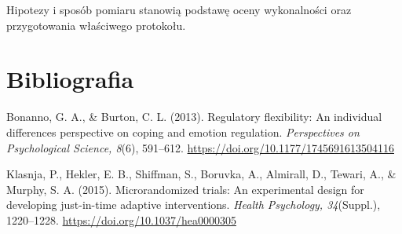 \documentclass[11pt,a4paper]{article}
\begin{document}
Hipotezy i sposób pomiaru stanowią podstawę oceny wykonalności oraz przygotowania właściwego protokołu.

\section*{Bibliografia}

{\setlength{\parindent}{0pt}
\setlength{\parskip}{5pt}
\hangindent=1.27cm
Bonanno, G. A., \& Burton, C. L. (2013). Regulatory flexibility: An individual differences perspective on coping and emotion regulation. \textit{Perspectives on Psychological Science, 8}(6), 591--612. \url{https://doi.org/10.1177/1745691613504116}\par
\hangindent=1.27cm
Klasnja, P., Hekler, E. B., Shiffman, S., Boruvka, A., Almirall, D., Tewari, A., \& Murphy, S. A. (2015). Microrandomized trials: An experimental design for developing just-in-time adaptive interventions. \textit{Health Psychology, 34}(Suppl.), 1220--1228. \url{https://doi.org/10.1037/hea0000305}\par
}
\end{document}
